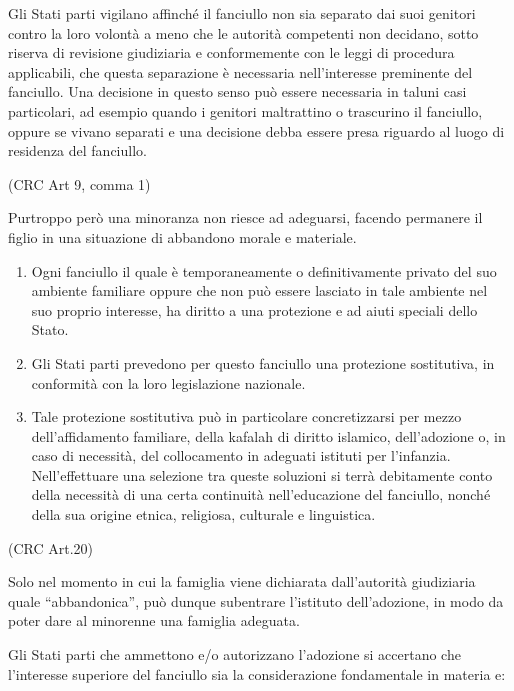 \documentclass[12pt,oneside,svgnames]{memoir}
\begin{document}
Gli Stati parti vigilano affinché il fanciullo non sia separato dai suoi
genitori contro la loro volontà a meno che le autorità competenti non
decidano, sotto riserva di revisione giudiziaria e conformemente con le
leggi di procedura applicabili, che questa separazione è necessaria
nell'interesse preminente del fanciullo. Una decisione in questo senso
può essere necessaria in taluni casi particolari, ad esempio quando i
genitori maltrattino o trascurino il fanciullo, oppure se vivano
separati e una decisione debba essere presa riguardo al luogo di
residenza del fanciullo.

(CRC Art 9, comma 1)

Purtroppo però una minoranza non riesce ad adeguarsi, facendo permanere
il figlio in una situazione di abbandono morale e materiale.

\begin{enumerate}
\def\labelenumi{\arabic{enumi}.}
\item
  Ogni fanciullo il quale è temporaneamente o definitivamente privato
  del suo ambiente familiare oppure che non può essere lasciato in tale
  ambiente nel suo proprio interesse, ha diritto a una protezione e ad
  aiuti speciali dello Stato.
\item
  Gli Stati parti prevedono per questo fanciullo una protezione
  sostitutiva, in conformità con la loro legislazione nazionale.
\item
  Tale protezione sostitutiva può in particolare concretizzarsi per
  mezzo dell'affidamento familiare, della kafalah di diritto islamico,
  dell'adozione o, in caso di necessità, del collocamento in adeguati
  istituti per l'infanzia. Nell'effettuare una selezione tra queste
  soluzioni si terrà debitamente conto della necessità di una certa
  continuità nell'educazione del fanciullo, nonché della sua origine
  etnica, religiosa, culturale e linguistica.
\end{enumerate}

(CRC Art.20)

Solo nel momento in cui la famiglia viene dichiarata dall'autorità
giudiziaria quale ``abbandonica'', può dunque subentrare l'istituto
dell'adozione, in modo da poter dare al minorenne una famiglia adeguata.

Gli Stati parti che ammettono e/o autorizzano l'adozione si accertano
che l'interesse superiore del fanciullo sia la considerazione
fondamentale in materia e:
\end{document}
